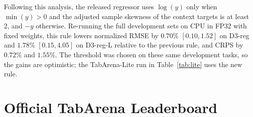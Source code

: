 \documentclass[11pt]{article}
\begin{document}
\begin{enumerate}
Following this analysis, the released regressor uses $\log(y)$ only when $\min(y) > 0$ and the adjusted sample skewness of the context targets is at least 2, and $-y$ otherwise. Re-running the full development sets on CPU in FP32 with fixed weights, this rule lowers normalized RMSE by $0.70\%$ $[0.10, 1.52]$ on D3-reg and $1.78\%$ $[0.15,4.05]$ on D3-reg-L relative to the previous rule, and CRPS by $0.72\%$ and $1.55\%$. The threshold was chosen on these same development tasks, so the gains are optimistic; the TabArena-Lite run in Table~\ref{tab:lite} uses the new rule. %
\end{enumerate}

\section{Official TabArena Leaderboard}
\label{sec:official}
\end{document}
